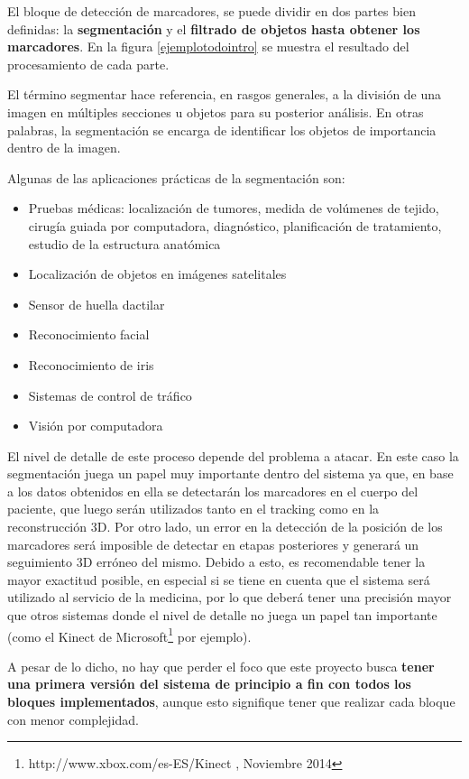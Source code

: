 El bloque de detección de marcadores, se puede dividir en dos partes bien definidas: la \textbf{segmentación} y el \textbf{filtrado de objetos hasta obtener los marcadores}. En la figura \ref{ejemplotodointro} se muestra el resultado del procesamiento de cada parte.

El término segmentar hace referencia, en rasgos generales, a la división de una imagen en múltiples secciones u objetos para su posterior análisis. En otras palabras, la segmentación se encarga de identificar los objetos de importancia dentro de la imagen. 

Algunas de las aplicaciones prácticas de la segmentación son:
\begin{itemize}
\item Pruebas médicas: localización de tumores, medida de volúmenes de tejido, cirugía guiada por computadora, diagnóstico, planificación de tratamiento, estudio de la estructura anatómica
\item Localización de objetos en imágenes satelitales
\item Sensor de  huella dactilar
\item Reconocimiento facial
\item Reconocimiento de iris
\item Sistemas de control de tráfico
\item Visión por computadora
\end{itemize}

El nivel de detalle de este proceso depende del problema a atacar. En este caso la segmentación juega un papel muy importante dentro del sistema ya que, en base a los datos obtenidos en ella se detectarán los marcadores en el cuerpo del paciente, que luego serán utilizados tanto en el tracking como en la reconstrucción 3D. Por otro lado, un error en la detección de la posición de los marcadores será imposible de detectar en etapas posteriores y generará un seguimiento 3D erróneo del mismo. Debido a esto, es recomendable tener la mayor exactitud posible, en especial si se tiene en cuenta que el sistema será utilizado al servicio de la medicina, por lo que deberá tener una precisión mayor que otros sistemas donde el nivel de detalle no juega un papel tan importante (como el Kinect de Microsoft\footnote{http://www.xbox.com/es-ES/Kinect , Noviembre 2014} por ejemplo).

A pesar de lo dicho, no hay que perder el foco que este proyecto busca \textbf{tener una primera versión del sistema de principio a fin con todos los bloques implementados}, aunque esto signifique tener que realizar cada bloque con menor complejidad.

